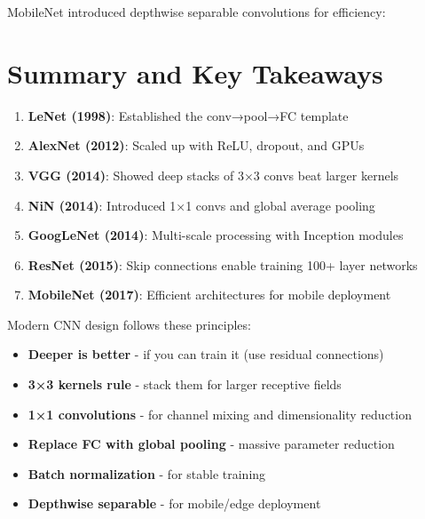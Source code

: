 \documentclass{article}
\begin{document}
MobileNet introduced depthwise separable convolutions for efficiency:


\section{Summary and Key Takeaways}

\begin{tcolorbox}[colback=green!5!white, colframe=green!50!black, title=Evolution of CNN Design]
\begin{enumerate}
    \item \textbf{LeNet (1998)}: Established the conv→pool→FC template
    \item \textbf{AlexNet (2012)}: Scaled up with ReLU, dropout, and GPUs
    \item \textbf{VGG (2014)}: Showed deep stacks of 3×3 convs beat larger kernels
    \item \textbf{NiN (2014)}: Introduced 1×1 convs and global average pooling
    \item \textbf{GoogLeNet (2014)}: Multi-scale processing with Inception modules
    \item \textbf{ResNet (2015)}: Skip connections enable training 100+ layer networks
    \item \textbf{MobileNet (2017)}: Efficient architectures for mobile deployment
\end{enumerate}
\end{tcolorbox}

\begin{tcolorbox}[colback=blue!5!white, colframe=blue!50!black, title=Design Principles]
Modern CNN design follows these principles:
\begin{itemize}
    \item \textbf{Deeper is better} - if you can train it (use residual connections)
    \item \textbf{3×3 kernels rule} - stack them for larger receptive fields
    \item \textbf{1×1 convolutions} - for channel mixing and dimensionality reduction
    \item \textbf{Replace FC with global pooling} - massive parameter reduction
    \item \textbf{Batch normalization} - for stable training
    \item \textbf{Depthwise separable} - for mobile/edge deployment
\end{itemize}
\end{tcolorbox}
\end{document}
